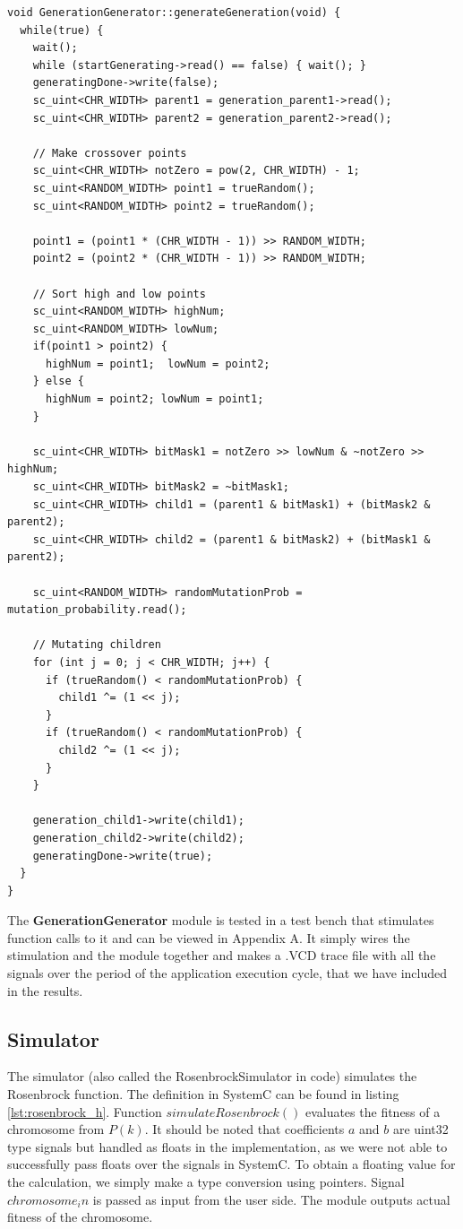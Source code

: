 \begin{lstlisting}[style=customc++,caption={GenerationGenerator.cpp},label={lst:generationgenerator_cpp}]
void GenerationGenerator::generateGeneration(void) { 
  while(true) {
    wait();	
    while (startGenerating->read() == false) { wait(); }
    generatingDone->write(false);
    sc_uint<CHR_WIDTH> parent1 = generation_parent1->read();
    sc_uint<CHR_WIDTH> parent2 = generation_parent2->read();

    // Make crossover points
    sc_uint<CHR_WIDTH> notZero = pow(2, CHR_WIDTH) - 1;
    sc_uint<RANDOM_WIDTH> point1 = trueRandom();
    sc_uint<RANDOM_WIDTH> point2 = trueRandom();

	point1 = (point1 * (CHR_WIDTH - 1)) >> RANDOM_WIDTH;
	point2 = (point2 * (CHR_WIDTH - 1)) >> RANDOM_WIDTH;
	
    // Sort high and low points
    sc_uint<RANDOM_WIDTH> highNum;
    sc_uint<RANDOM_WIDTH> lowNum;
    if(point1 > point2) {
      highNum = point1;  lowNum = point2;
    } else {
      highNum = point2; lowNum = point1;
    }
  
    sc_uint<CHR_WIDTH> bitMask1 = notZero >> lowNum & ~notZero >> highNum;
    sc_uint<CHR_WIDTH> bitMask2 = ~bitMask1;
    sc_uint<CHR_WIDTH> child1 = (parent1 & bitMask1) + (bitMask2 & parent2);
    sc_uint<CHR_WIDTH> child2 = (parent1 & bitMask2) + (bitMask1 & parent2);

    sc_uint<RANDOM_WIDTH> randomMutationProb = mutation_probability.read();

    // Mutating children
    for (int j = 0; j < CHR_WIDTH; j++) {
      if (trueRandom() < randomMutationProb) {
        child1 ^= (1 << j);
      }
      if (trueRandom() < randomMutationProb) {
      	child2 ^= (1 << j);
      }
    }
    
    generation_child1->write(child1);
    generation_child2->write(child2);
    generatingDone->write(true);
  }
}
\end{lstlisting}

The \textbf{GenerationGenerator} module is tested in a test bench that stimulates function calls to it and can be viewed in Appendix A. It simply wires the stimulation and the module together and makes a .VCD trace file with all the signals over the period of the application execution cycle, that we have included in the results.

\subsection{Simulator}
The simulator (also called the RosenbrockSimulator in code) simulates the Rosenbrock function. The definition in SystemC can be found in listing \ref{lst:rosenbrock_h}. Function $simulateRosenbrock()$ evaluates the fitness of a chromosome from $P(k)$. It should be noted that coefficients $a$ and $b$ are uint32 type signals but handled as floats in the implementation, as we were not able to successfully pass floats over the signals in SystemC. To obtain a floating value for the calculation, we simply make a type conversion using pointers. Signal $chromosome_in$ is passed as input from the user side. The module outputs actual fitness of the chromosome.

